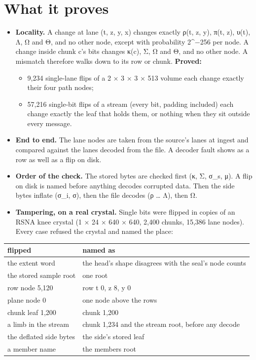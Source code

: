 \section{\texorpdfstring{What it proves}{What it proves}}

\begin{itemize}
\item \textbf{Locality.} A change at lane (t, z, y, x) changes exactly ρ(t, z, y), π(t, z), υ(t), Λ, Ω and Θ, and no other node, except with probability 2\textasciicircum{}−256 per node. A change inside chunk c's bits changes κ(c), Σ, Ω and Θ, and no other node. A mismatch therefore walks down to its row or chunk. \textbf{Proved:}

\begin{itemize}
\item 9,234 single-lane flips of a 2 × 3 × 3 × 513 volume each change exactly their four path nodes;
\item 57,216 single-bit flips of a stream (every bit, padding included) each change exactly the leaf that holds them, or nothing when they sit outside every message.
\end{itemize}
\item \textbf{End to end.} The lane nodes are taken from the source's lanes at ingest and compared against the lanes decoded from the file. A decoder fault shows as a row as well as a flip on disk.
\item \textbf{Order of the check.} The stored bytes are checked first (κ, Σ, σ\_\allowbreak{}s, μ). A flip on disk is named before anything decodes corrupted data. Then the side bytes inflate (σ\_\allowbreak{}i, σ), then the file decodes (ρ … Λ), then Ω.
\item \textbf{Tampering, on a real crystal.} Single bits were flipped in copies of an RSNA knee crystal (1 × 24 × 640 × 640, 2,400 chunks, 15,386 lane nodes). Every case refused the crystal and named the place:
\end{itemize}

{\small
\setlength{\tabcolsep}{6pt}
\begin{longtable}{>{\RaggedRight\arraybackslash}p{}>{\RaggedRight\arraybackslash}p{}}
\toprule
flipped & named as \\
\midrule
\endhead
the extent word & the head's shape disagrees with the seal's node counts \\
the stored sample root & one root \\
row node 5,120 & row t 0, z 8, y 0 \\
plane node 0 & one node above the rows \\
chunk leaf 1,200 & chunk 1,200 \\
a limb in the stream & chunk 1,234 and the stream root, before any decode \\
the deflated side bytes & the side's stored leaf \\
a member name & the members root \\
\bottomrule
\end{longtable}
}

